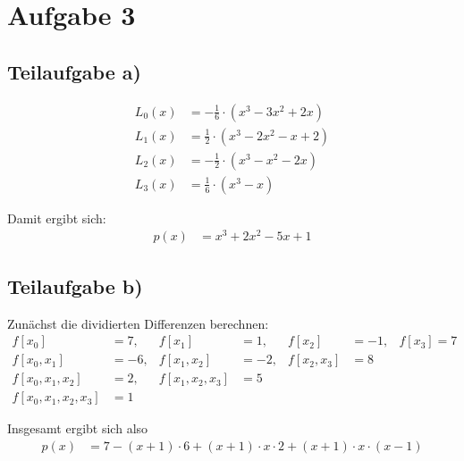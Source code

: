 \section*{Aufgabe 3}
\subsection*{Teilaufgabe a)}
\begin{align}
	L_0(x) &= - \frac{1}{6} \cdot (x^3 - 3 x^2 + 2x)\\
	L_1(x) &= \frac{1}{2} \cdot (x^3 - 2x^2 - x + 2)\\
	L_2(x) &= - \frac{1}{2} \cdot (x^3 - x^2 - 2x)\\
	L_3(x) &= \frac{1}{6} \cdot (x^3 - x)
\end{align}

Damit ergibt sich:
\begin{align}
	p(x) &= x^3 + 2x^2 - 5x + 1
\end{align}

\subsection*{Teilaufgabe b)}
Zunächst die dividierten Differenzen berechnen:
\begin{align}
	f[x_0] &= 7,           &f[x_1] &= 1,       & f[x_2] &= -1,     & f[x_3] = 7\\
	f[x_0, x_1] &= -6,     &f[x_1, x_2] &= -2, &f[x_2, x_3] &= 8\\
	f[x_0, x_1, x_2] &= 2, &f[x_1, x_2, x_3] &= 5\\
	f[x_0, x_1, x_2, x_3] &= 1
\end{align}

Insgesamt ergibt sich also
\begin{align}
	p(x) &= 7 - (x+1) \cdot 6 + (x+1) \cdot x \cdot 2 + (x+1) \cdot x \cdot (x-1)
\end{align}


